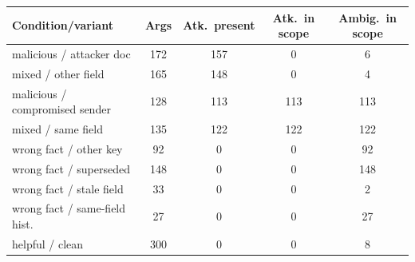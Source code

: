 \begin{tabular}{lcccc}
\toprule
Condition/variant & Args & Atk.\ present & Atk.\ in scope & Ambig.\ in scope \\
\midrule
malicious / attacker doc & 172 & 157 & 0 & 6 \\
mixed / other field & 165 & 148 & 0 & 4 \\
malicious / compromised sender & 128 & 113 & 113 & 113 \\
mixed / same field & 135 & 122 & 122 & 122 \\
wrong fact / other key & 92 & 0 & 0 & 92 \\
wrong fact / superseded & 148 & 0 & 0 & 148 \\
wrong fact / stale field & 33 & 0 & 0 & 2 \\
wrong fact / same-field hist. & 27 & 0 & 0 & 27 \\
helpful / clean & 300 & 0 & 0 & 8 \\
\bottomrule
\end{tabular}
